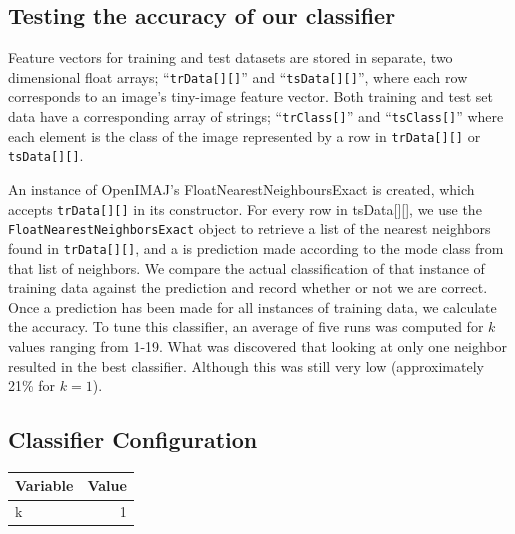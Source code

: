 \documentclass[a4paper]{article}
\begin{document}
\subsection{Testing the accuracy of our classifier}

Feature vectors for training and test datasets are stored in separate, two dimensional float arrays; ``\texttt{trData[][]}'' and ``\texttt{tsData[][]}'', where each row corresponds to an image’s tiny-image feature vector. Both training and test set data have a corresponding array of strings; ``\texttt{trClass[]}'' and ``\texttt{tsClass[]}'' where each element is the class of the image represented by a row in \texttt{trData[][]} or \texttt{tsData[][]}.

An instance of OpenIMAJ’s FloatNearestNeighboursExact is created, which accepts \texttt{trData[][]} in its constructor. For every row in tsData[][], we use the \texttt{FloatNearestNeighborsExact} object to retrieve a list of the nearest neighbors found in \texttt{trData[][]}, and a is prediction made according to the mode class from that list of neighbors. We compare the actual classification of that instance of training data against the prediction and record whether or not we are correct. Once a prediction has been made for all instances of training data, we calculate the accuracy. To tune this classifier, an average of five runs was computed for $k$ values ranging from 1-19. What was discovered that looking at only one neighbor resulted in the best classifier. Although this was still very low (approximately 21\% for $k=1$).

\subsection{Classifier Configuration}

\begin{center}
	\def\arraystretch{1.5}%
    \begin{tabular}{ | l | r |}
    \hline
    \textbf{Variable} & \textbf{Value} \\ \hline
    k & 1 \\ \hline
    \end{tabular}
\end{center}
\bigskip

\end{document}

